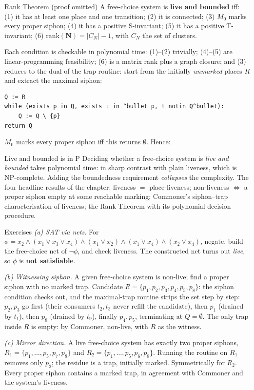 \begin{notebox}{Rank Theorem (proof omitted)}
A free-choice system is \textbf{live and bounded} iff: (1) it has at least one place and one transition; (2) it is connected; (3) $M_0$ marks every proper siphon; (4) it has a positive S-invariant; (5) it has a positive T-invariant; (6) $\mathrm{rank}(\mathbf{N}) = |C_N| - 1$, with $C_N$ the set of clusters.
\end{notebox}

Each condition is checkable in polynomial time: (1)--(2) trivially; (4)--(5) are linear-programming feasibility; (6) is a matrix rank plus a graph closure; and (3) reduces to the dual of the trap routine: start from the initially \emph{unmarked} places $R$ and extract the maximal siphon:
\begin{lstlisting}
Q := R
while (exists p in Q, exists t in ^bullet p, t notin Q^bullet):
    Q := Q \ {p}
return Q
\end{lstlisting}
$M_0$ marks every proper siphon iff this returns $\emptyset$. Hence:

\begin{notebox}{Live and bounded is in P}
Deciding whether a free-choice system is \emph{live and bounded} takes polynomial time: in sharp contrast with plain liveness, which is \textsf{NP}-complete. Adding the boundedness requirement \emph{collapses} the complexity. The four headline results of the chapter: liveness $=$ place-liveness; non-liveness $\iff$ a proper siphon empty at some reachable marking; Commoner's siphon--trap characterisation of liveness; the Rank Theorem with its polynomial decision procedure.
\end{notebox}

\begin{examplebox}{Exercises}
\emph{(a) SAT via nets.} For $\phi = x_2 \wedge (x_1 \vee \overline{x_3} \vee \overline{x_4}) \wedge (x_1 \vee \overline{x_2}) \wedge (\overline{x_1} \vee x_4) \wedge (\overline{x_2} \vee \overline{x_4})$, negate, build the free-choice net of $\neg\phi$, and check liveness. The constructed net turns out \emph{live}, so $\phi$ is \textbf{not satisfiable}.
\par\smallskip
\emph{(b) Witnessing siphon.} A given free-choice system is non-live; find a proper siphon with no marked trap. Candidate $R = \{p_1, p_2, p_3, p_4, p_5, p_8\}$: the siphon condition checks out, and the maximal-trap routine strips the set step by step: $p_2, p_3$ go first (their consumers $t_2, t_3$ never refill the candidate), then $p_1$ (drained by $t_1$), then $p_8$ (drained by $t_9$), finally $p_4, p_5$, terminating at $Q = \emptyset$. The only trap inside $R$ is empty: by Commoner, non-live, with $R$ as the witness.
\par\smallskip
\emph{(c) Mirror direction.} A live free-choice system has exactly two proper siphons, $R_1 = \{p_1, \ldots, p_5, p_7, p_8\}$ and $R_2 = \{p_1, \ldots, p_5, p_6, p_8\}$. Running the routine on $R_1$ removes only $p_2$; the residue is a trap, initially marked. Symmetrically for $R_2$. Every proper siphon contains a marked trap, in agreement with Commoner and the system's liveness.
\end{examplebox}
